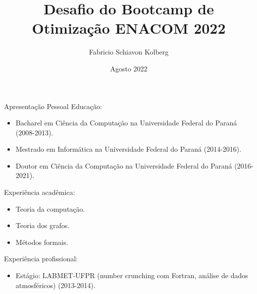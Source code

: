 \documentclass{beamer}
\title{Desafio do Bootcamp de Otimização ENACOM 2022}
\author[Fabricio Schiavon Kolberg]{Fabricio Schiavon Kolberg}
\date{Agosto 2022}
\begin{document}
\begin{frame}
\titlepage
\end{frame}

\begin{frame}{Apresentação Pessoal}\pause
Educação:
\begin{itemize}
\item Bacharel em Ciência da Computação na Universidade Federal do Paraná (2008-2013).\pause
\item Mestrado em Informática na Universidade Federal do Paraná (2014-2016).\pause
\item Doutor em Ciência da Computação na Universidade Federal do Paraná (2016-2021).\pause
\end{itemize}
Experiência acadêmica:
\begin{itemize}
\item Teoria da computação.\pause
\item Teoria dos grafos.\pause
\item Métodos formais.\pause
\end{itemize}
Experiência profissional:
\begin{itemize}
\item Estágio: LABMET-UFPR (number crunching com Fortran, análise de dados atmosféricos) (2013-2014).
\end{itemize}
\end{frame}
\end{document}
